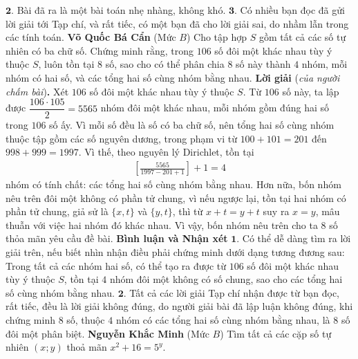 \begin{multicols}{2}
	\vskip 0.05cm
	$\pmb{2.}$ Bài đã ra là một bài toán nhẹ nhàng, không khó.
	\vskip 0.05cm
	$\pmb{3.}$ Có nhiều bạn đọc đã gửi lời giải tới Tạp chí, và rất tiếc, có một bạn đã cho lời giải sai, do nhầm lẫn trong các tính toán.
	\vskip 0.1cm
	\hfill \textbf{\color{thachthuctoanhoc}Võ Quốc Bá Cẩn}
	\vskip 0.1cm
	{}
	(Mức $B$) Cho tập hợp $S$ gồm tất cả các số tự nhiên có ba chữ số. Chứng minh rằng, trong $106$ số đôi một khác nhau tùy ý thuộc $S$, luôn tồn tại $8$ số, sao cho có thể phân chia $8$ số này thành $4$ nhóm, mỗi nhóm có hai số, và các tổng hai số cùng nhóm bằng nhau.
	\vskip 0.05cm
	\textbf{\color{thachthuctoanhoc}Lời giải} (\textit{của người chấm bài})\textbf{\color{thachthuctoanhoc}.}
	\vskip 0.05cm
	Xét $106$ số đôi một khác nhau tùy ý thuộc $S$.
	\vskip 0.05cm
	Từ $106$ số này, ta lập được $\dfrac{106 \cdot 105}{2} = 5565$  nhóm đôi một khác nhau, mỗi nhóm gồm đúng hai số trong $106$ số ấy.
	\vskip 0.05cm
	Vì mỗi số đều là số có ba chữ số, nên tổng hai số cùng nhóm thuộc tập gồm các số nguyên dương, trong phạm vi từ $100 + 101 = 201$ đến $998 + 999 = 1997$. Vì thế, theo nguyên lý Dirichlet, tồn tại
	\begin{align*}
		\left[ {\frac{{5565}}{{1997 - 201 + 1}}} \right] + 1 = 4
	\end{align*}
	nhóm có tính chất: các tổng hai số cùng nhóm bằng nhau.
	\vskip 0.05cm
	Hơn nữa, bốn nhóm nêu trên đôi một không có phần tử chung, vì nếu ngược lại, tồn tại hai nhóm có phần tử chung, giả sử là $\{x, t\}$ và $\{y, t\}$, thì từ $x + t = y + t$ suy ra $x = y$, mâu thuẫn với việc hai nhóm đó khác nhau.
	\vskip 0.05cm
	Vì vậy, bốn nhóm nêu trên cho ta 8 số thỏa mãn yêu cầu đề bài.
	\vskip 0.05cm
	\textbf{\color{thachthuctoanhoc}Bình luận và Nhận xét}
	\vskip 0.05cm
	$\pmb{1.}$ Có thể dễ dàng tìm ra lời giải trên, nếu biết nhìn nhận điều phải chứng minh dưới dạng tương đương sau: Trong tất cả các nhóm hai số, có thể tạo ra được từ $106$ số đôi một khác nhau tùy ý thuộc $S$, tồn tại $4$ nhóm đôi một không có số chung, sao cho các tổng hai số cùng nhóm bằng nhau.
	\vskip 0.05cm
	$\pmb{2.}$ Tất cả các lời giải Tạp chí nhận được từ bạn đọc, rất tiếc, đều là lời giải không đúng, do người giải bài đã lập luận không đúng, khi chứng minh $8$ số, thuộc $4$ nhóm có các tổng hai số cùng nhóm bằng nhau, là $8$ số đôi một phân biệt.
	\vskip 0.1cm
	\hfill \textbf{\color{thachthuctoanhoc}Nguyễn Khắc Minh}
	\vskip 0.1cm
	{}
	(Mức $B$) Tìm tất cả các cặp số tự nhiên $(x;y)$ thoả mãn $x^2+16=5^y$. 

\end{multicols}
